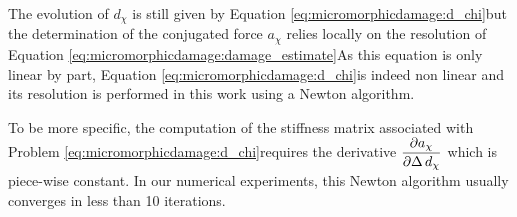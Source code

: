 The evolution of \(d_{\chi}\) is still given by Equation
\eqref{eq:micromorphicdamage:d_chi}but the determination of the conjugated
force \(a_{\chi}\) relies locally on the resolution of Equation
\eqref{eq:micromorphicdamage:damage_estimate}As this equation is only linear
by part, Equation \eqref{eq:micromorphicdamage:d_chi}is indeed non linear and
its resolution is performed in this work using a Newton algorithm.

To be more specific, the computation of the stiffness matrix associated
with Problem \eqref{eq:micromorphicdamage:d_chi}requires the derivative
\(\displaystyle \frac{\displaystyle \partial a_{\chi}}{\displaystyle \partial \Delta\,d_{\chi}}\) which is piece-wise constant. In
our numerical experiments, this Newton algorithm usually converges in
less than 10 iterations.